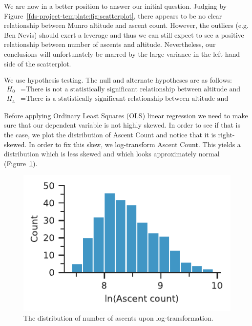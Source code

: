 \documentclass[11pt,a4paper]{article}
\begin{document}
We are now in a better position to answer our initial question. Judging by Figure~\ref{fds-project-template:fig:scatterplot}, there appears to be no clear relationship between Munro altitude and ascent count. However, the outliers (e.g. Ben Nevis) should exert a leverage and thus we can still expect to see a positive relationship between number of ascents and altitude. Nevertheless, our conclusions will unfortunately be marred by the large variance in the left-hand side of the scatterplot.

We use hypothesis testing. The null and alternate hypotheses are as follows:
\begin{align*}
    H_0 &= \text{There is not a statistically significant relationship between altitude and number of ascents.}\\
    H_\text{a} &= \text{There is a statistically significant relationship between altitude and number of ascents.}
\end{align*}

Before applying Ordinary Least Squares (OLS) linear regression we need to make sure that our dependent variable is not highly skewed. In order to see if that is the case, we plot the distribution of Ascent Count and notice that it is right-skewed. In order to fix this skew, we log-transform Ascent Count. This yields a distribution which is less skewed and which looks approximately normal (Figure~\ref{fds-project-template:fig:dist_log_ascent_count}).
\begin{figure} [h!]
  \centering
  \includegraphics{report/ascent_count_distribution.pdf}
  \caption{The distribution of number of ascents upon log-transformation.}
  \label{fds-project-template:fig:dist_log_ascent_count}
\end{figure}
\end{document}
